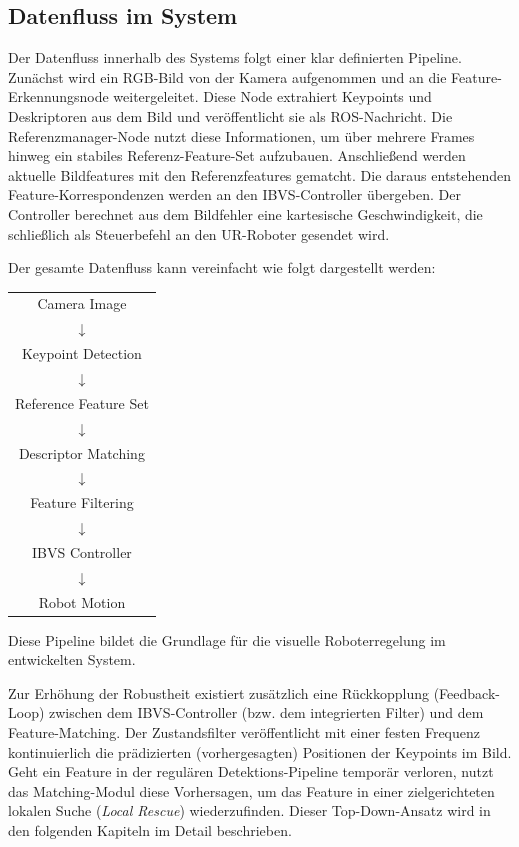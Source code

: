 \newpage
\subsection{Datenfluss im System}
\label{subsec:datenfluss}

Der Datenfluss innerhalb des Systems folgt einer klar definierten Pipeline. Zunächst wird ein RGB-Bild von der Kamera aufgenommen und an die Feature-Erkennungsnode weitergeleitet. Diese Node extrahiert Keypoints und Deskriptoren aus dem Bild und veröffentlicht sie als ROS-Nachricht. Die Referenzmanager-Node nutzt diese Informationen, um über mehrere Frames hinweg ein stabiles Referenz-Feature-Set aufzubauen. Anschließend werden aktuelle Bildfeatures mit den Referenzfeatures gematcht. Die daraus entstehenden Feature-Korrespondenzen werden an den \ac{IBVS}-Controller übergeben. Der Controller berechnet aus dem Bildfehler eine kartesische Geschwindigkeit, die schließlich als Steuerbefehl an den UR-Roboter gesendet wird.

Der gesamte Datenfluss kann vereinfacht wie folgt dargestellt werden:

\begin{center}
	\begin{tabular}{c}
		Camera Image \\
		$\downarrow$ \\
		Keypoint Detection \\
		$\downarrow$ \\
		Reference Feature Set \\
		$\downarrow$ \\
		Descriptor Matching \\
		$\downarrow$ \\
		Feature Filtering \\
		$\downarrow$ \\
		IBVS Controller \\
		$\downarrow$ \\
		Robot Motion
	\end{tabular}
\end{center}

Diese Pipeline bildet die Grundlage für die visuelle Roboterregelung im entwickelten System.

Zur Erhöhung der Robustheit existiert zusätzlich eine Rückkopplung (Feedback-Loop) zwischen dem \ac{IBVS}-Controller (bzw. dem integrierten Filter) und dem Feature-Matching. Der Zustandsfilter veröffentlicht mit einer festen Frequenz kontinuierlich die prädizierten (vorhergesagten) Positionen der Keypoints im Bild. Geht ein Feature in der regulären Detektions-Pipeline temporär verloren, nutzt das Matching-Modul diese Vorhersagen, um das Feature in einer zielgerichteten lokalen Suche (\textit{Local Rescue}) wiederzufinden. Dieser Top-Down-Ansatz wird in den folgenden Kapiteln im Detail beschrieben.

